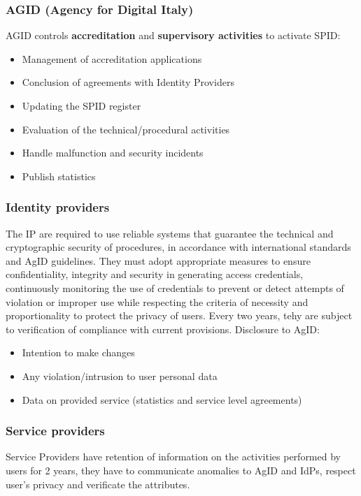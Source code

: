 \documentclass[a4paper, 10pt, titlepage]{article}
\begin{document}
\subsubsection{AGID (Agency for Digital Italy)}
AGID controls \textbf{accreditation} and \textbf{supervisory activities} to activate SPID:
\begin{itemize}
\item Management of accreditation applications
\item Conclusion of agreements with Identity Providers
\item Updating the SPID register
\item Evaluation of the technical/procedural activities
\item Handle malfunction and security incidents
\item Publish statistics
\end{itemize}

\subsubsection{Identity providers}
The IP are required to use reliable systems that guarantee the technical and cryptographic security of procedures, in accordance with international standards and AgID guidelines. They must adopt appropriate measures to ensure confidentiality, integrity and security in generating access credentials, continuously monitoring the use of credentials to prevent or detect attempts of violation or improper use while respecting the criteria of necessity and proportionality to protect the privacy of users. Every two years, tehy are subject to verification of compliance with current provisions. Disclosure to AgID:
\begin{itemize}
\item Intention to make changes
\item Any violation/intrusion to user personal data
\item Data on provided service (statistics and service level agreements)
\end{itemize}

\subsubsection{Service providers}
Service Providers have retention of information on the activities performed by users for 2 years, they have to communicate anomalies to AgID and IdPs, respect user's privacy and verificate the attributes.
\end{document}

